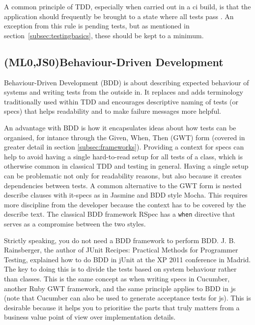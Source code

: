 \documentclass[11pt]{article}
\begin{document}
A common principle of TDD, especially when carried out in a \gls{ci} build, is that the application should frequently be brought to a state where all tests pass \cite[question~2]{Rovegard}. An exception from this rule is pending tests, but as mentioned in section~\ref{subsec:testingbasics}, these should be kept to a minimum.

\subsection{(ML0,JS0)Behaviour-Driven Development}
\label{subsec:bdd}

Behaviour-Driven Development (BDD) is about describing expected behaviour of systems and writing tests from the outside in. It replaces and adds terminology traditionally used within TDD and encourages descriptive naming of tests (or \glspl{spec}) that helps readability and to make failure messages more helpful. \cite[questions~17-18]{Ahnve}

An advantage with BDD is how it encapsulates ideas about how tests can be organised, for intance through the Given, When, Then (GWT) form (covered in greater detail in section \ref{subsec:frameworks}). Providing a context for \glspl{spec} can help to avoid having a single hard-to-read setup for all tests of a class, which is otherwise common in classical TDD and testing in general. Having a single setup can be problematic not only for readability reasons, but also because it creates dependencies between tests. A common alternative to the GWT form is nested describe clauses with it-specs as in Jasmine and BDD style Mocha. This requires more discipline from the developer because the context has to be covered by the describe text. The classical BDD framework RSpec has a \texttt{when} directive that serves as a compromise between the two styles. \cite[question~19]{Ahnve}

Strictly speaking, you do not need a BDD framework to perform BDD. J. B. Rainsberger, the author of JUnit Recipes: Practical Methods for Programmer Testing, explained how to do BDD in jUnit at the XP 2011 conference in Madrid. The key to doing this is to divide the tests based on system behaviour rather than classes. This is the same concept as when writing \glspl{spec} in Cucumber, another Ruby GWT framework, and the same principle applies to BDD in \gls{js} (note that Cucumber can also be used to generate acceptance tests for \gls{js}). This is desirable because it helps you to prioritise the parts that truly matters from a business value point of view over implementation details. \cite[question~20]{Ahnve}
\end{document}
